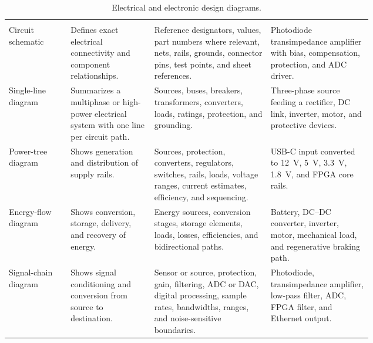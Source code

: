 
\begin{singlespace}
\setlength{\LTcapwidth}{\linewidth}
\begin{longtable}{@{}L{0.17\linewidth} L{0.23\linewidth} L{0.32\linewidth} L{\tabcolsep\relax}@{}}
\caption{Electrical and electronic design diagrams.}\label{tab:electrical-diagrams}\\
 &  &  &  \\
\midrule
\endfirsthead
{}
 &  &  &  \\
\midrule
\endhead
\bottomrule
\endfoot
Circuit schematic & Defines exact electrical connectivity and component relationships. & Reference designators, values, part numbers where relevant, nets, rails, grounds, connector pins, test points, and sheet references. & Photodiode transimpedance amplifier with bias, compensation, protection, and ADC driver. \\
\addlinespace[3pt]
Single-line diagram & Summarizes a multiphase or high-power electrical system with one line per circuit path. & Sources, buses, breakers, transformers, converters, loads, ratings, protection, and grounding. & Three-phase source feeding a rectifier, DC link, inverter, motor, and protective devices. \\
\addlinespace[3pt]
Power-tree diagram & Shows generation and distribution of supply rails. & Sources, protection, converters, regulators, switches, rails, loads, voltage ranges, current estimates, efficiency, and sequencing. & USB-C input converted to 12~V, 5~V, 3.3~V, 1.8~V, and FPGA core rails. \\
\addlinespace[3pt]
Energy-flow diagram & Shows conversion, storage, delivery, and recovery of energy. & Energy sources, conversion stages, storage elements, loads, losses, efficiencies, and bidirectional paths. & Battery, DC--DC converter, inverter, motor, mechanical load, and regenerative braking path. \\
\addlinespace[3pt]
Signal-chain diagram & Shows signal conditioning and conversion from source to destination. & Sensor or source, protection, gain, filtering, ADC or DAC, digital processing, sample rates, bandwidths, ranges, and noise-sensitive boundaries. & Photodiode, transimpedance amplifier, low-pass filter, ADC, FPGA filter, and Ethernet output. \\

\end{longtable}
\end{singlespace}
